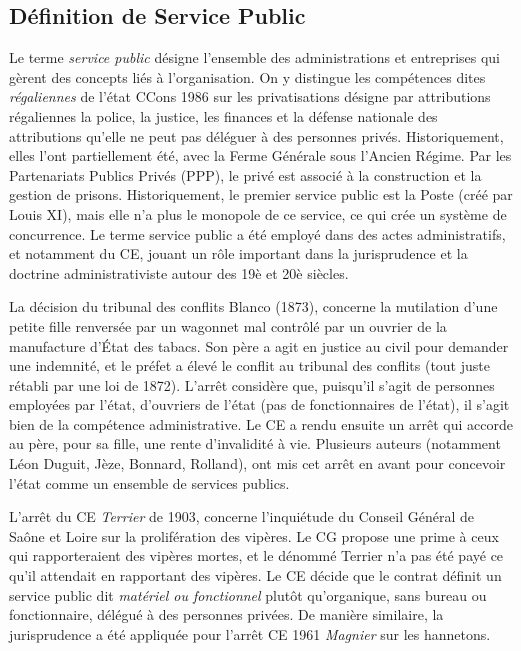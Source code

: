 \documentclass[math]{cours}
\begin{document}
\subsection{Définition de Service Public}
Le terme \emph{service public} désigne l'ensemble des administrations et entreprises qui gèrent des concepts liés à l'organisation.
On y distingue les compétences dites \emph{régaliennes} de l'état
CCons 1986 sur les privatisations désigne par attributions régaliennes la police, la justice, les finances et la défense nationale des attributions qu'elle ne peut pas déléguer à des personnes privés.
Historiquement, elles l'ont partiellement été, avec la Ferme Générale sous l'Ancien Régime.
Par les Partenariats Publics Privés (PPP), le privé est associé à la construction et la gestion de prisons.
Historiquement, le premier service public est la Poste (créé par Louis XI), mais elle n'a plus le monopole de ce service, ce qui crée un système de concurrence.
Le terme service public a été employé dans des actes administratifs, et notamment du CE, jouant un rôle important dans la jurisprudence et la doctrine administrativiste autour des 19è et 20è siècles.

La décision du tribunal des conflits Blanco (1873), concerne la mutilation d'une petite fille renversée par un wagonnet mal contrôlé par un ouvrier de la manufacture d'État des tabacs.
Son père a agit en justice au civil pour demander une indemnité, et le préfet a élevé le conflit au tribunal des conflits (tout juste rétabli par une loi de 1872).
L'arrêt considère que, puisqu'il s'agit de personnes employées par l'état, d'ouvriers de l'état (pas de fonctionnaires de l'état), il s'agit bien de la compétence administrative.
Le CE a rendu ensuite un arrêt qui accorde au père, pour sa fille, une rente d'invalidité à vie.
Plusieurs auteurs (notamment Léon Duguit, Jèze, Bonnard, Rolland), ont mis cet arrêt en avant pour concevoir l'état comme un ensemble de services publics.

\medskip

L'arrêt du CE \emph{Terrier} de 1903, concerne l'inquiétude du Conseil Général de Saône et Loire sur la prolifération des vipères.
Le CG propose une prime à ceux qui rapporteraient des vipères mortes, et le dénommé Terrier n'a pas été payé ce qu'il attendait en rapportant des vipères.
Le CE décide que le contrat définit un service public dit \emph{matériel ou fonctionnel} plutôt qu'organique, sans bureau ou fonctionnaire, délégué à des personnes privées.
De manière similaire, la jurisprudence a été appliquée pour l'arrêt CE 1961 \emph{Magnier} sur les hannetons.
\end{document}
